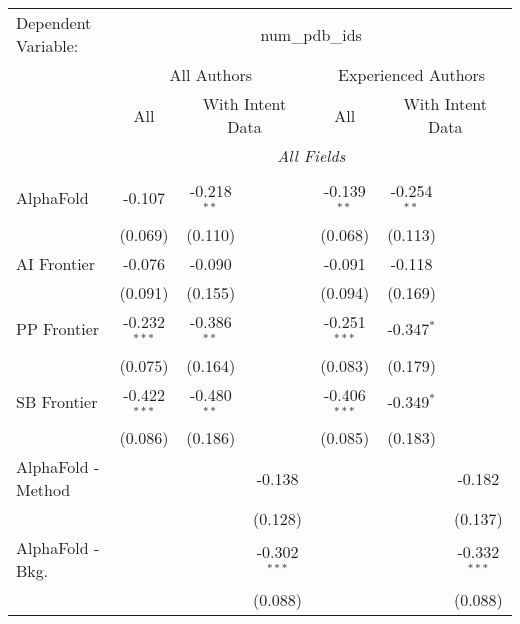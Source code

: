 \begingroup
\centering
\begin{tabular}{lcccccc}
   \tabularnewline \midrule \midrule
   Dependent Variable: & \multicolumn{6}{c}{num\_pdb\_ids}\\
 & \multicolumn{3}{c}{All Authors} & \multicolumn{3}{c}{Experienced Authors} \\
\cmidrule(lr){2-4} \cmidrule(lr){5-7}
 & \multicolumn{1}{c}{All} & \multicolumn{2}{c}{With Intent Data} & \multicolumn{1}{c}{All} & \multicolumn{2}{c}{With Intent Data} \\
\cmidrule(lr){2-2} \cmidrule(lr){3-4} \cmidrule(lr){5-5} \cmidrule(lr){6-7}
 & \multicolumn{6}{c}{\textit{All Fields}} \\ \\
   AlphaFold            & -0.107         & -0.218$^{**}$ &                & -0.139$^{**}$  & -0.254$^{**}$ &   \\   
                        & (0.069)        & (0.110)       &                & (0.068)        & (0.113)       &   \\   
   AI Frontier          & -0.076         & -0.090        &                & -0.091         & -0.118        &   \\   
                        & (0.091)        & (0.155)       &                & (0.094)        & (0.169)       &   \\   
   PP Frontier          & -0.232$^{***}$ & -0.386$^{**}$ &                & -0.251$^{***}$ & -0.347$^{*}$  &   \\   
                        & (0.075)        & (0.164)       &                & (0.083)        & (0.179)       &   \\   
   SB Frontier          & -0.422$^{***}$ & -0.480$^{**}$ &                & -0.406$^{***}$ & -0.349$^{*}$  &   \\   
                        & (0.086)        & (0.186)       &                & (0.085)        & (0.183)       &   \\   
   AlphaFold - Method   &                &               & -0.138         &                &               & -0.182\\   
                        &                &               & (0.128)        &                &               & (0.137)\\   
   AlphaFold - Bkg.     &                &               & -0.302$^{***}$ &                &               & -0.332$^{***}$\\   
                        &                &               & (0.088)        &                &               & (0.088)\\   

\end{tabular}

